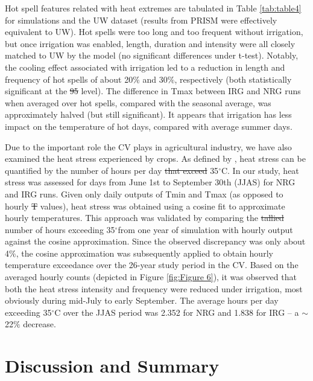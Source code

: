 \documentclass[draft,ms]{agutex}   %
\providecommand{\DIFadd}[1]{{\protect\color{blue}\uwave{#1}}} %
\providecommand{\DIFdel}[1]{{\protect\color{red}\sout{#1}}}                      %
\providecommand{\DIFaddbegin}{} %
\providecommand{\DIFaddend}{} %
\providecommand{\DIFdelbegin}{} %
\providecommand{\DIFdelend}{} %
\begin{document}
\begin{article}
Hot spell features related with heat extremes are tabulated in Table \ref{tab:table4} for simulations and the UW dataset (results from PRISM were effectively equivalent to UW). Hot spells were too long and too frequent without irrigation, but once irrigation was enabled, length, duration and intensity were all closely matched to UW by the model (no significant differences under t-test). Notably, the cooling effect associated with irrigation led to a reduction in length and frequency of hot spells of about 20$\%$ and 30$\%$, respectively (both statistically significant at the \DIFdelbegin \DIFdel{95}%
\DIFdelend \DIFaddbegin \DIFadd{0.05 }\DIFaddend level). The difference in Tmax between IRG and NRG runs when averaged over hot spells, compared with the seasonal average, was approximately halved (but still significant). It appears that irrigation has less impact on the temperature of hot days, compared with average summer days.


Due to the important role the CV plays in agricultural industry, we have also examined the heat stress experienced by crops. As defined by \cite{teixeira2013global}, heat stress can be quantified by the number of hours per day \DIFdelbegin \DIFdel{that exceed }\DIFdelend \DIFaddbegin \DIFadd{exceeding }\DIFaddend 35$^\circ$C. In our study, heat stress was assessed for days from June 1st to September 30th (JJAS) for NRG and IRG runs. Given only daily outputs of Tmin and Tmax (as opposed to hourly \DIFdelbegin \DIFdel{T }\DIFdelend \DIFaddbegin \DIFadd{temperature }\DIFaddend values), heat stress was obtained using a cosine fit to approximate hourly temperatures. This approach was validated by comparing the \DIFdelbegin \DIFdel{tallied }\DIFdelend number of hours exceeding 35$^\circ$\DIFaddbegin \DIFadd{C }\DIFaddend from one year of simulation with hourly output against the cosine approximation. Since the observed discrepancy was only about 4$\%$, the cosine approximation was subsequently applied to obtain hourly temperature exceedance over the 26-year study period in the CV. Based on the averaged hourly counts (depicted in Figure \ref{fig:Figure 6}), it was observed that both the heat stress intensity and frequency were reduced under irrigation, most obviously during mid-July to early September. The average hours per day exceeding 35$^\circ$C over the JJAS period was 2.352 for NRG and 1.838 for IRG -- a $\sim$22$\%$ decrease.


\section{Discussion and Summary}


\end{article}
\end{document}
